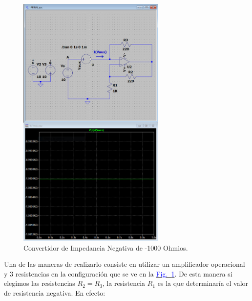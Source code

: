 \documentclass[12pt,a4paper]{report} %
\newcommand{\fref}[1]{\hyperref[#1]{\textcolor{blue}{Fig.~\ref*{#1}}}}
\begin{document}
	\vspace{0.5cm}\begin{figure}[h]
		\centering
		\includegraphics[width=0.65\textwidth]{NIC_B.jpg}
		\caption{Convertidor de Impedancia Negativa de -1000 Ohmios.}
		\label{fig:NIC}
	\end{figure}\smallskip
	
	\newpage
	
	Una de las maneras de realizarlo consiste en utilizar un amplificador operacional y 3 resistencias en la configuración que se ve en la \fref{fig:NIC}. De esta manera si elegimos las resistencias $R_2=R_3$, la resistencia $R_1$ es la que determinaría el valor de resistencia negativa. En efecto:
	
	\vspace{0.5cm}
	
\end{document}
